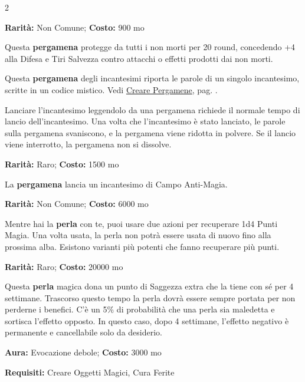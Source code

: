 \begin{multicols}{2}

\textbf{Rarità:} Non Comune; \textbf{Costo:} 900 mo

Questa \textbf{pergamena} protegge da tutti i non morti per 20 round, concedendo +4 alla Difesa e Tiri Salvezza contro attacchi o effetti prodotti dai non morti.


Questa \textbf{pergamena} degli incantesimi riporta le parole di un singolo incantesimo, scritte in un codice mistico. Vedi \hyperlink{crearepergamene}{Creare Pergamene}, pag. \pageref{crearepergamene}.

Lanciare l'incantesimo leggendolo da una pergamena richiede il normale tempo di lancio dell'incantesimo. Una volta che l'incantesimo è stato lanciato, le parole sulla pergamena svaniscono, e la pergamena viene ridotta in polvere. Se il lancio viene interrotto, la pergamena non si dissolve.


\textbf{Rarità:} Raro; \textbf{Costo:} 1500 mo

La \textbf{pergamena} lancia un incantesimo di Campo Anti-Magia.


\textbf{Rarità:} Non Comune; \textbf{Costo:} 6000 mo

Mentre hai la \textbf{perla} con te, puoi usare due azioni per recuperare 1d4 Punti Magia. Una volta usata, la perla non potrà essere usata di nuovo fino alla prossima alba. Esistono varianti più potenti che fanno recuperare più punti.


\textbf{Rarità:} Raro; \textbf{Costo:} 20000 mo

Questa \textbf{perla} magica dona un punto di Saggezza extra che la tiene con sé per 4 settimane. Trascorso questo tempo la perla dovrà essere sempre portata per non perderne i benefici. C'è un 5\% di probabilità che una perla sia maledetta e sortisca l'effetto opposto. In questo caso, dopo 4 settimane, l'effetto negativo è permanente e cancellabile solo da desiderio.


\textbf{Aura:} Evocazione debole; \textbf{Costo:} 3000 mo

\textbf{Requisiti:} Creare Oggetti Magici, Cura Ferite


\end{multicols}
